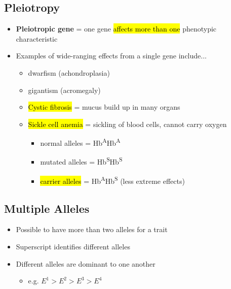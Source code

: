 \documentclass[a4paper,12pt]{article}
\begin{document}
\subsection{Pleiotropy}
\begin{itemize}
    \item{\textbf{Pleiotropic gene} = one gene \hl{affects more than one} phenotypic characteristic}
    \item{
            Examples of wide-ranging effects from a single gene include...
            \begin{itemize}
                \item{dwarfism (achondroplasia)}
                \item{gigantism (acromegaly)}
                \item{\hl{Cystic fibrosis} = mucus build up in many organs}
                \item{
                        \hl{Sickle cell anemia} = sickling of blood cells, cannot carry oxygen
                        \begin{itemize}
                            \item{normal alleles = Hb\textsuperscript{A}Hb\textsuperscript{A}}
                            \item{mutated alleles = Hb\textsuperscript{S}Hb\textsuperscript{S}}
                            \item{\hl{carrier alleles} = Hb\textsuperscript{A}Hb\textsuperscript{S} (less extreme effects)}
                        \end{itemize}
                    }
            \end{itemize}
        }
\end{itemize}

\subsection{Multiple Alleles}
\begin{itemize}
    \item{Possible to have more than two alleles for a trait}
    \item{Superscript identifies different alleles}
    \item{
            Different alleles are dominant to one another
            \begin{itemize}
                \item{e.g. $E^1 > E^2 > E^3 > E^4$}
            \end{itemize}
        }
\end{itemize}
\end{document}
